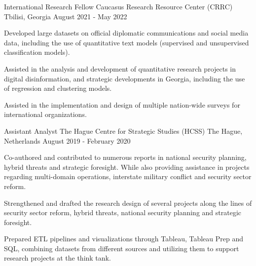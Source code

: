 \begin{cventries}
  \cventry
    {International Research Fellow} %
    {Caucasus Research Resource Center (CRRC)} %
    {Tbilisi, Georgia} %
    {August 2021 - May 2022} %
    {
      \begin{cvitems} %
        \item {Developed large datasets on official diplomatic communications and social media data, including the use of quantitative text models (supervised and unsupervised classification models).}
        \item {Assisted in the analysis and development of quantitative research projects in digital disinformation, and strategic developments in Georgia, including the use of regression and clustering models.}
        \item {Assisted in the implementation and design of multiple nation-wide surveys for international organizations.}
      \end{cvitems}
    }

  \cventry
    {Assistant Analyst} %
    {The Hague Centre for Strategic Studies (HCSS)} %
    {The Hague, Netherlands} %
    {August 2019 - February 2020} %
    {
      \begin{cvitems} %
        \item {Co-authored and contributed to numerous reports in national security planning, hybrid threats and strategic foresight. While also providing assistance in projects regarding multi-domain operations, interstate military conflict and security sector reform.}
        \item {Strengthened and drafted the research design of several projects along the lines of security sector reform, hybrid threats, national security planning and strategic foresight.}
        \item {Prepared ETL pipelines and visualizations through Tableau, Tableau Prep and SQL, combining datasets from different sources and utilizing them to support research projects at the think tank.}
      \end{cvitems}
    }

\end{cventries}
